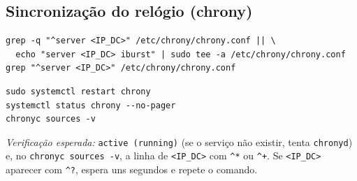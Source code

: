 
\subsection[Sincronização do relógio (chrony)]{Sincronização do relógio (chrony)}


\begin{lstlisting}[style=bashstyle]
grep -q "^server <IP_DC>" /etc/chrony/chrony.conf || \
  echo "server <IP_DC> iburst" | sudo tee -a /etc/chrony/chrony.conf
grep "^server <IP_DC>" /etc/chrony/chrony.conf
\end{lstlisting}


\begin{lstlisting}[style=bashstyle]
sudo systemctl restart chrony
systemctl status chrony --no-pager
chronyc sources -v
\end{lstlisting}

\emph{Verificação esperada:} \texttt{active (running)} (se o serviço não existir, tenta \texttt{chronyd}) e, no \texttt{chronyc sources -v}, a linha de \texttt{\textless{}IP\_DC\textgreater{}} com \texttt{\textasciicircum{}*} ou \texttt{\textasciicircum{}+}. Se \texttt{\textless{}IP\_DC\textgreater{}} aparecer com \texttt{\textasciicircum{}?}, espera uns segundos e repete o comando.

